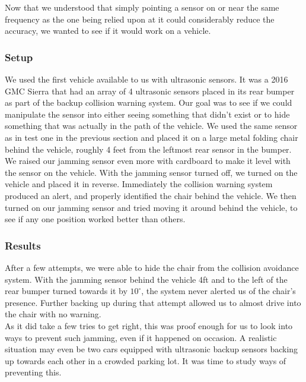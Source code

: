 \documentclass[conference]{IEEEtran}
\begin{document}
Now that we understood that simply pointing a sensor on or near the same frequency as the one being relied upon at it could considerably reduce the accuracy, we wanted to see if it would work on a vehicle.

\subsubsection{Setup}

We used the first vehicle available to us with ultrasonic sensors. It was a 2016 GMC Sierra that had an array of 4 ultrasonic sensors placed in its rear bumper as part of the backup collision warning system. Our goal was to see if we could manipulate the sensor into either seeing something that didn't exist or to hide something that was actually in the path of the vehicle. We used the same sensor as in test one in the previous section and placed it on a large metal folding chair behind the vehicle, roughly 4 feet from the leftmost rear sensor in the bumper. We raised our jamming sensor even more with cardboard to make it level with the sensor on the vehicle. With the jamming sensor turned off, we turned on the vehicle and placed it in reverse. Immediately the collision warning system produced an alert, and properly identified the chair behind the vehicle. We then turned on our jamming sensor and tried moving it around behind the vehicle, to see if any one position worked better than others.

\subsubsection{Results}

After a few attempts, we were able to hide the chair from the collision avoidance system. With the jamming sensor behind the vehicle 4ft and to the left of the rear bumper turned towards it by $10^{\circ}$, the system never alerted us of the chair's presence. Further backing up during that attempt allowed us to almost drive into the chair with no warning. \\
As it did take a few tries to get right, this was proof enough for us to look into ways to prevent such jamming, even if it happened on occasion. A realistic situation may even be two cars equipped with ultrasonic backup sensors backing up towards each other in a crowded parking lot. It was time to study ways of preventing this.
\end{document}
